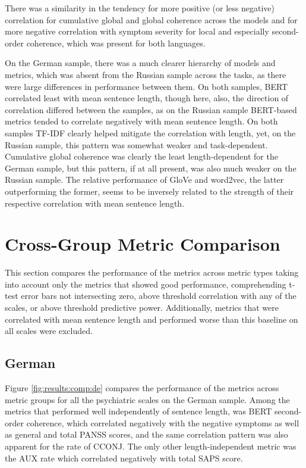 There was a similarity in the tendency for more positive (or less negative) correlation for cumulative global and global coherence across the models and for more negative correlation with symptom severity for local and especially second-order coherence, which was present for both languages.

On the German sample, there was a much clearer hierarchy of models and metrics,  which was absent from the Russian sample across the tasks, as there were large differences in performance between them. On both samples, BERT correlated least with mean sentence length, though here, also, the direction of correlation differed between the samples, as on the Russian sample BERT-based metrics tended to correlate negatively with mean sentence length. On both samples TF-IDF clearly helped mitigate the correlation with length, yet, on the Russian sample, this pattern was somewhat weaker and task-dependent. Cumulative global coherence was clearly the least length-dependent for the German sample, but this pattern, if at all present, was also much weaker on the Russian sample. The relative performance of GloVe and word2vec, the latter outperforming the former, seems to be inversely related to the strength of their respective correlation with mean sentence length.

\clearpage
\section{Cross-Group Metric Comparison}
\label{sec:results:clinical:cross_group}

This section compares the performance of the metrics across metric types taking into account only the metrics that showed good performance, comprehending t-test error bars not intersecting zero, above threshold correlation with any of the scales, or above threshold predictive power. Additionally, metrics that were correlated with mean sentence length and performed worse than this baseline on all scales were excluded.

\subsection{German}

Figure \ref{fig:results:comp:de} compares the performance of the metrics across metric groups for all the psychiatric scales on the German sample. Among the metrics that performed well independently of sentence length, was BERT second-order coherence, which correlated negatively with the negative symptoms as well as general and total PANSS scores, and the same correlation pattern was also apparent for the rate of CCONJ. The only other length-independent metric was the AUX rate which correlated negatively with total SAPS score. 

